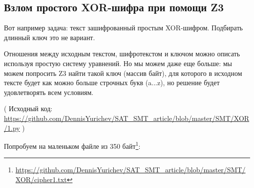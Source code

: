 
\subsection{Взлом простого XOR-шифра при помощи Z3}
\label{XOR_Z3}

Вот например задача: текст зашифрованный простым XOR-шифром.
Подбирать длинный ключ это не вариант.

Отношения между исходным текстом, шифротекстом и ключом можно описать используя простую систему уравнений.
Но мы можем даже еще больше: мы можем попросить Z3 найти такой ключ (массив байт), для которого в исходном тексте
будет как можно больше строчных букв (a...z), но решение будет удовлетворять всем условиям.



( Исходный код: \url{https://github.com/DennisYurichev/SAT_SMT_article/blob/master/SMT/XOR/1.py} )

Попробуем на маленьком файле из 350 байт\footnote{\url{https://github.com/DennisYurichev/SAT_SMT_article/blob/master/SMT/XOR/cipher1.txt}}:

